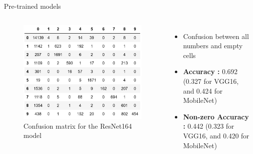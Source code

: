 \documentclass[12pt, dvipsnames]{beamer}
\begin{document}
\begin{frame}{Pre-trained models}
    \begin{columns}
        \begin{figure}
            \centering
            \includegraphics[width=1\linewidth]{resources/png/ResNet164_ConfusionMatrix.PNG}
            \caption{Confusion matrix for the ResNet164 model}
        \end{figure}
        \begin{itemize}
            \item Confusion between all numbers and empty cells
            \item \textbf{Accuracy :} 0.692\\
            (0.327 for VGG16, and 0.424 for MobileNet)
            \item \textbf{Non-zero Accuracy :} 0.442
            (0.323 for VGG16, and 0.420 for MobileNet)
        \end{itemize}
    \end{columns}
\end{frame}
\end{document}
